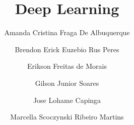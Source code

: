 \title{Deep Learning}
\label{chp:deep-learning}
\author{Amanda Cristina Fraga De Albuquerque \and
        Brendon Erick Euzebio Rus Peres \and
        Erikson Freitas de Morais \and
        Gilson Junior Soares \and
        Jose Lohame Capinga \and
        Marcella Scoczynski Ribeiro Martins}

%

\maketitle










